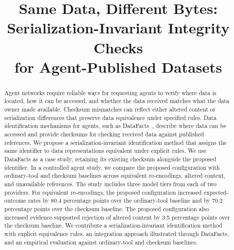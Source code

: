 \documentclass[conference]{IEEEtran}
\begin{document}
\raggedbottom

\title{Same Data, Different Bytes:\\Serialization-Invariant Integrity Checks\\for Agent-Published Datasets}

\author{
\and
{}
}

\maketitle

\begin{abstract}
Agent networks require reliable ways for requesting agents to verify where data is located, how it can be accessed, and whether the data received matches what the data owner made available.
Checksum mismatches can reflect either altered content or serialization differences that preserve data equivalence under specified rules.
Data identification mechanisms for agents, such as DataFacts~\cite{gao2026datafacts}, describe where data can be accessed and provide checksums for checking received data against published references.
We propose a serialization-invariant identification method that assigns the same identifier to data representations equivalent under explicit rules.
We use DataFacts as a case study, retaining its existing checksum alongside the proposed identifier.
In a controlled agent study, we compare the proposed configuration with ordinary-tool and checksum baselines across equivalent re-encodings, altered content, and unavailable references.
The study includes three model tiers from each of two providers.
For equivalent re-encodings, the proposed configuration increased expected-outcome rates by 80.4 percentage points over the ordinary-tool baseline and by 70.2 percentage points over the checksum baseline.
The proposed configuration also increased evidence-supported rejection of altered content by 3.5 percentage points over the checksum baseline.
We contribute a serialization-invariant identification method with explicit equivalence rules, an integration approach illustrated through DataFacts, and an empirical evaluation against ordinary-tool and checksum baselines.
\end{abstract}
\end{document}
